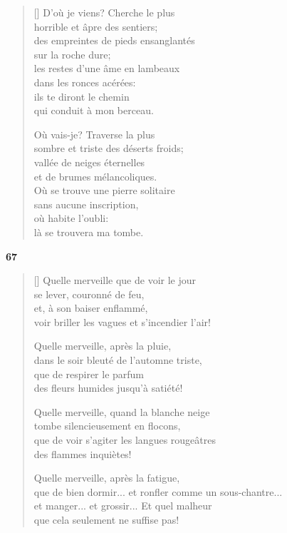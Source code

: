 \documentclass[a4paper,12pt]{book}
\begin{document}
\begin{verse}[\versewidth]
  D'où je viens? Cherche le plus \\
  horrible et âpre des sentiers; \\
  des empreintes de pieds ensanglantés \\
  sur la roche dure; \\
  les restes d'une âme en lambeaux \\
  dans les ronces acérées: \\
  ils te diront le chemin \\
  qui conduit à mon berceau.

  Où vais-je? Traverse la plus \\
  sombre et triste des déserts froids; \\
  vallée de neiges éternelles \\
  et de brumes mélancoliques. \\
  Où se trouve une pierre solitaire \\
  sans aucune inscription, \\
  où habite l'oubli: \\
  là se trouvera ma tombe.
\end{verse}

\bigskip

\begin{center}
  \textbf{67}
\end{center}

\settowidth{\versewidth}{que de bien dormir... et ronfler comme un sous-chantre...}

\begin{verse}[\versewidth]
  Quelle merveille que de voir le jour \\
  se lever, couronné de feu, \\
  et, à son baiser enflammé, \\
  voir briller les vagues et s'incendier l'air!

  Quelle merveille, après la pluie, \\
  dans le soir bleuté de l'automne triste, \\
  que de respirer le parfum \\
  des fleurs humides jusqu'à satiété!

  Quelle merveille, quand la blanche neige \\
  tombe silencieusement en flocons, \\
  que de voir s'agiter les langues rougeâtres \\
  des flammes inquiètes!

  Quelle merveille, après la fatigue, \\
  que de bien dormir... et ronfler comme un sous-chantre... \\
  et manger... et grossir... Et quel malheur \\
  que cela seulement ne suffise pas!
\end{verse}
\end{document}
